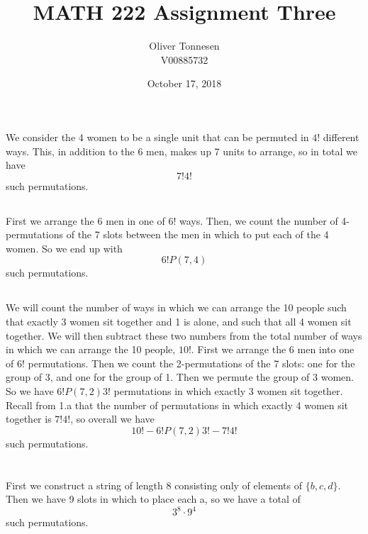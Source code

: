 \documentclass{article}
\title{\vspace{-4cm}MATH 222 Assignment Three}
\author{Oliver Tonnesen\\V00885732}
\date{October 17, 2018}
\begin{document}
\maketitle
\renewcommand{\thesubsection}{\thesection.\alph{subsection}}
\section{} %
\subsection{}
	We consider the 4 women to be a single unit that can be permuted in $4!$ different ways.
	This, in addition to the 6 men, makes up 7 units to arrange, so in total we have
	\[7!4!\]
	such permutations.
\subsection{}
	First we arrange the 6 men in one of $6!$ ways. Then, we count the number of
	4-permutations of the 7 slots between the men in which to put each of the
	4 women.  So we end up with
	\[6!P(7,4)\]
	such permutations.
\subsection{}
	We will count the number of ways in which we can arrange the 10 people such that exactly
	3 women sit together and 1 is alone, and such that all 4 women sit together. We will then
	subtract these two numbers from the total number of ways in which we can arrange the 10
	people, $10!$.
	\newline
	First we arrange the 6 men into one of $6!$ permutations. Then we count the 2-permutations
	of the 7 slots: one for the group of 3, and one for the group of 1. Then we permute the
	group of 3 women. So we have $6!P(7,2)3!$ permutations in which exactly 3 women sit together.
	\newline
	Recall from 1.a that the number of permutations in which exactly 4 women sit together is $7!4!$,
	so overall we have
	\[10!-6!P(7,2)3!-7!4!\]
	such permutations.
\section{} %
\subsection{}
	First we construct a string of length 8 consisting only of elements of $\{b,c,d\}$.
	Then we have 9 slots in which to place each a, so we have a total of
	\[3^8\cdot9^4\]
	such permutations.
\end{document}
